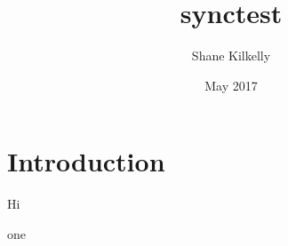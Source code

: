 \documentclass{article}
\title{synctest}
\author{Shane Kilkelly}
\date{May 2017}
\begin{document}
\maketitle

\section{Introduction}


Hi

one
\end{document}
